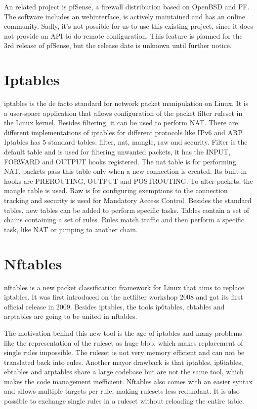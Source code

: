 \documentclass{report}
\begin{document}
An related project is pfSense\cite{pfsense}, a firewall distribution based on
OpenBSD and PF. The software includes an webinterface, is actively
maintained and has an online community. Sadly, it's not possible for us
to use this existing project, since it does not provide an API to do
remote configuration. This feature is planned for the 3rd release of
pfSense, but the release date is unknown until further notice.


\section{Iptables}\label{iptables}

iptables\cite{iptables} is the de facto standard for network packet manipulation on
Linux. It is a user-space application that allows configuration of
the packet filter ruleset in the Linux kernel. Besides filtering, it can
be used to perform NAT. There are different implementations of iptables
for different protocols like IPv6 and ARP. Iptables has 5 standard
tables: filter, nat, mangle, raw and security. Filter is the default
table and is used for filtering unwanted packets, it has the INPUT,
FORWARD and OUTPUT hooks registered. The nat table is for performing
NAT, packets pass this table only when a new connection is created. Its built-in
hooks are PREROUTING, OUTPUT and POSTROUTING. To alter
packets, the mangle table is used. Raw is for configuring exemptions to
the connection tracking and security is used for Mandatory Access
Control. Besides the standard tables, new tables can be added to perform
specific tasks. Tables contain a set of chains containing a set of rules.
Rules match traffic and then perform a specific task, like NAT or
jumping to another chain.

\section{Nftables}\label{nftables}

nftables\cite{nftables}\cite{nftables2}\cite{nftables3} is a new packet classification framework for Linux that aims to
replace iptables. It was first introduced on the netfilter workshop 2008
and got its first official release in 2009. Besides iptables, the tools
ip6tables, ebtables and arptables are going to be united in nftables.

The motivation behind this new tool is the age of iptables and many
problems like the representation of the ruleset as huge blob, which
makes replacement of single rules impossible. The ruleset is not very
memory efficient and can not be translated back into rules. Another
mayor drawback is that iptables, ip6tables, ebtables and arptables share
a large codebase but are not the same tool, which makes the code
management inefficient. Nftables also comes with an easier syntax and
allows multiple targets per rule, making rulesets less redundant. It is
also possible to exchange single rules in a ruleset without reloading
the entire table.
\end{document}
